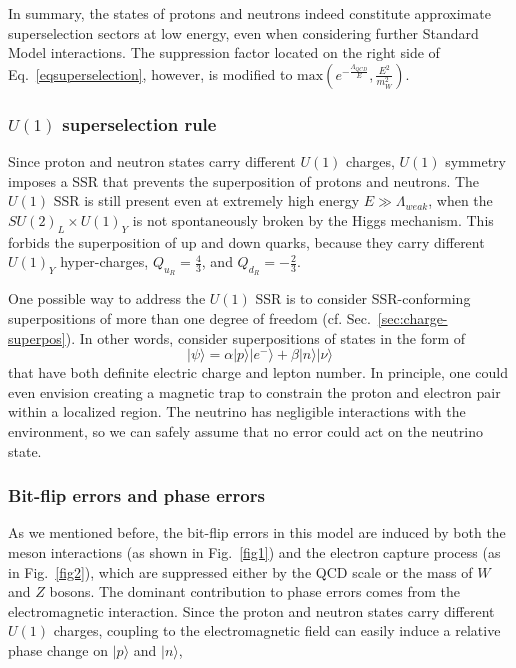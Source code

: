 \documentclass[11pt,english]{article}
\newcommand{\Sec}[1]{Sec.~\ref{#1}}
\begin{document}
In summary, the states of protons and neutrons indeed constitute approximate superselection sectors at low energy, even when considering further Standard Model interactions. The suppression factor located on the right side of Eq.~\eqref{eqsuperselection}, however, is modified to $\text{max}(e^{-\frac{\Lambda_{QCD}}{E}}, \frac{E^2}{m_{W}^2})$.  

\subsubsection*{$U(1)$ superselection rule}

Since proton and neutron states carry different $U(1)$ charges, $U(1)$ symmetry imposes a SSR that prevents the superposition of protons and neutrons. The $U(1)$ SSR is still present even at extremely high energy $E\gg \Lambda_{weak}$, when the $SU(2)_L\times U(1)_Y$ is not spontaneously broken by the Higgs mechanism. This forbids the superposition of up and down quarks, because they carry different $U(1)_Y$ hyper-charges, $Q_{u_R}=\frac{4}{3}$, and $Q_{d_R}=-\frac{2}{3}$.

One possible way to address the $U(1)$ SSR is to consider SSR-conforming superpositions of more than one degree of freedom (cf. \Sec{sec:charge-superpos}). In other words, consider superpositions of states in the form of 
\begin{equation}
    |\psi\rangle =\alpha |p\rangle|e^{-}\rangle+\beta|n\rangle|\nu\rangle
\end{equation}
that have both definite electric charge and lepton number. In principle, one could even envision creating a magnetic trap to constrain the proton and electron pair within a localized region. The neutrino has negligible interactions with the environment, so we can safely assume that no error could act on the neutrino state.

\subsubsection*{Bit-flip errors and phase errors}

As we mentioned before, the bit-flip errors in this model are induced by  both the meson interactions (as shown in Fig.~\ref{fig1}) and the electron capture process (as in Fig.~\ref{fig2}), which are suppressed either by the QCD scale or the mass of $W$ and $Z$ bosons. The dominant contribution to phase errors comes from the electromagnetic interaction.  Since the proton and neutron states carry different $U(1)$ charges, coupling to the electromagnetic field can easily induce a relative phase change on $|p\rangle$ and $|n\rangle$, 
\end{document}

